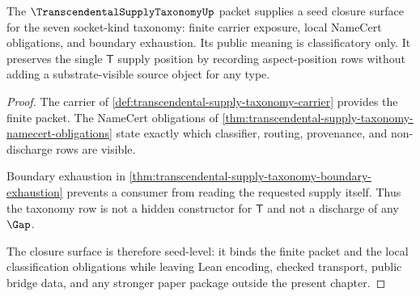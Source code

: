 \begin{theorem}
\label{thm:transcendental-supply-taxonomy-closure-surface}
The $\TranscendentalSupplyTaxonomyUp$ packet supplies a seed closure surface for the seven socket-kind taxonomy: finite carrier exposure, local NameCert obligations, and boundary exhaustion. Its public meaning is classificatory only. It preserves the single $\mathsf{T}$ supply position by recording aspect-position rows without adding a substrate-visible source object for any type.
\end{theorem}
\begin{proof}
The carrier of \autoref{def:transcendental-supply-taxonomy-carrier} provides the finite packet. The NameCert obligations of \autoref{thm:transcendental-supply-taxonomy-namecert-obligations} state exactly which classifier, routing, provenance, and non-discharge rows are visible.

Boundary exhaustion in \autoref{thm:transcendental-supply-taxonomy-boundary-exhaustion} prevents a consumer from reading the requested supply itself. Thus the taxonomy row is not a hidden constructor for $\mathsf{T}$ and not a discharge of any $\Gap$.

The closure surface is therefore seed-level: it binds the finite packet and the local classification obligations while leaving Lean encoding, checked transport, public bridge data, and any stronger paper package outside the present chapter.
\end{proof}

